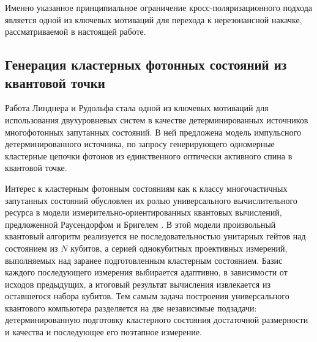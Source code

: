 \documentclass[11pt]{article}    %
\numberwithin{equation}{section}
\begin{document}
Именно указанное принципиальное ограничение кросс-поляризационного
подхода является одной из ключевых мотиваций для перехода к нерезонансной
накачке, рассматриваемой в настоящей работе.

\subsection{Генерация кластерных фотонных состояний из квантовой точки}

Работа Линднера и Рудольфа \cite{lindner2009} стала одной из ключевых
мотиваций для использования двухуровневых систем в качестве
детерминированных источников многофотонных запутанных состояний.
В ней предложена модель импульсного детерминированного источника,
по запросу генерирующего одномерные кластерные цепочки фотонов
из единственного оптически активного спина в квантовой точке.

Интерес к кластерным фотонным состояниям как к классу
многочастичных запутанных состояний обусловлен их ролью универсального
вычислительного ресурса в модели измерительно-ориентированных
квантовых вычислений,
предложенной Раусендорфом и Бригелем \cite{raussendorf2001}.
В этой модели произвольный квантовый алгоритм реализуется не
последовательностью унитарных гейтов \cite{browne2005} над состоянием из $N$ кубитов,
а серией однокубитных проективных измерений, выполняемых над заранее подготовленным
кластерным состоянием. Базис каждого последующего измерения
выбирается адаптивно, в зависимости от исходов предыдущих, а итоговый
результат вычисления извлекается из оставшегося набора кубитов.
Тем самым задача построения универсального квантового
компьютера разделяется на две независимые подзадачи: детерминированную
подготовку кластерного состояния достаточной размерности и качества
и последующее его поэтапное измерение.

\end{document}
